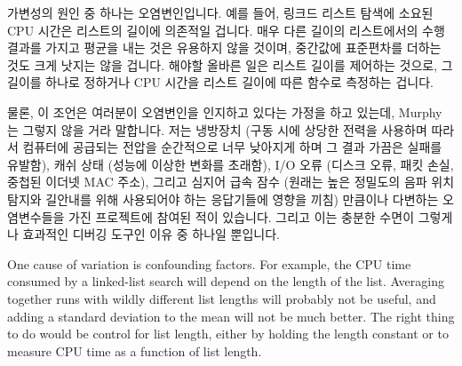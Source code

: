 가변성의 원인 중 하나는 오염변인입니다.
예를 들어, 링크드 리스트 탐색에 소요된 CPU 시간은 리스트의 길이에 의존적일
겁니다.
매우 다른 길이의 리스트에서의 수행 결과를 가지고 평균을 내는 것은 유용하지 않을
것이며, 중간값에 표준편차를 더하는 것도 크게 낫지는 않을 겁니다.
해야할 올바른 일은 리스트 길이를 제어하는 것으로, 그 길이를 하나로 정하거나 CPU
시간을 리스트 길이에 따른 함수로 측정하는 겁니다.

물론, 이 조언은 여러분이 오염변인을 인지하고 있다는 가정을 하고 있는데, Murphy
는 그렇지 않을 거라 말합니다.
저는 냉방장치 (구동 시에 상당한 전력을 사용하며 따라서 컴퓨터에 공급되는 전압을
순간적으로 너무 낮아지게 하며 그 결과 가끔은 실패를 유발함), 캐쉬 상태 (성능에
이상한 변화를 초래함), I/O 오류 (디스크 오류, 패킷 손실, 중첩된 이더넷 MAC
주소), 그리고 심지어 급속 잠수 (원래는 높은 정밀도의 음파 위치 탐지와 길안내를
위해 사용되어야 하는 응답기들에 영향을 끼침) 만큼이나 다변하는 오염변수들을
가진 프로젝트에 참여된 적이 있습니다.
그리고 이는 충분한 수면이 그렇게나 효과적인 디버깅 도구인 이유 중 하나일
뿐입니다.

\iffalse

One cause of variation is confounding factors.
For example, the CPU time consumed by a linked-list search will depend
on the length of the list.
Averaging together runs with wildly different list lengths will
probably not be useful, and adding a standard deviation to the mean
will not be much better.
The right thing to do would be control for list length, either by
holding the length constant or to measure CPU time as a function of
list length.

